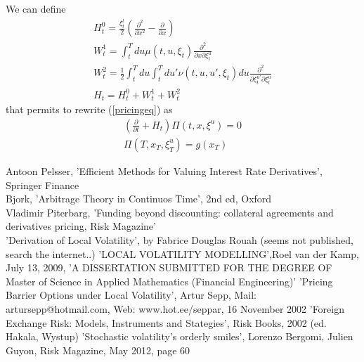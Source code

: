 \documentclass[a4paper,10pt]{report}
\theoremstyle{plain}
\theoremstyle{definition}
\newcommand\be{\begin{eqnarray}}    %
\newcommand\ee{\end{eqnarray}}
\newcommand{\lp} {\left( }
\newcommand{\rp} {\right)}
\begin{document}
We can define
\be 
\label{ht0}
H_t^0 = \frac{\xi_t^t}{2}  \lp \frac{\partial^2}{\partial x ^2 } - \frac{\partial}{\partial x }  \rp \\
\label{wt1}
W_t^1 = \int_t^T  du  \mu \lp t, u, \xi_t \rp \frac{\partial^2}{\partial x \partial \xi_t^u} \\
\label{wt2}
W_t^2 =  \frac{1}{2} \int_t^T du  \int_t^T  du' \nu \lp t, u, u', \xi_t \rp  du  \frac{\partial^2}{\partial \xi_t^{u'} \partial \xi_t^u} \\
H_t = H_t^0 + W_t^1 + W_t^2
\ee
that permits to rewrite (\ref{pricingeq}) as
\be 
\label{pricingeq1}
\lp \frac{\partial}{\partial t } + H_t  \rp \Pi\lp t, x, \xi^u\rp = 0 \\
\Pi\lp T, x_T, \xi_T^u\rp = g(x_T)
\ee


\begin{thebibliography}{99}
 Antoon Pelsser, 'Efficient Methods for Valuing Interest Rate Derivatives', Springer Finance\\
 Bjork, 'Arbitrage Theory in Continuos Time', 2nd ed, Oxford\\
 Vladimir Piterbarg, 'Funding beyond discounting: collateral agreements and derivatives pricing, Risk Magazine'\\
 'Derivation of Local Volatility', by Fabrice Douglas Rouah (seems not published, search the internet..)
 'LOCAL VOLATILITY MODELLING',Roel van der Kamp, July 13, 2009, 'A DISSERTATION SUBMITTED FOR THE DEGREE OF
Master of Science in Applied Mathematics (Financial Engineering)'
 'Pricing Barrier Options under Local Volatility', Artur Sepp, Mail: artursepp@hotmail.com, Web: www.hot.ee/seppar, 16 November 2002
 'Foreign Exchange Risk: Models, Instruments and Stategies', Risk Books, 2002 (ed. Hakala, Wystup)
 'Stochastic volatility's orderly smiles', Lorenzo Bergomi, Julien Guyon, Risk Magazine, May 2012, page 60


\end{thebibliography}



\printindex
\end{document}
